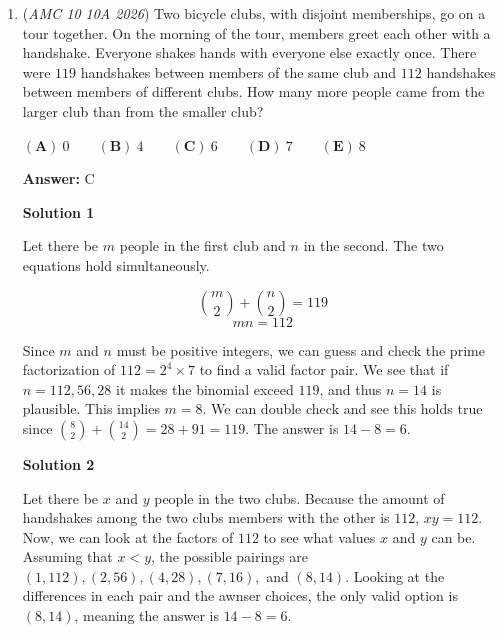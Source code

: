 \begin{enumerate}
 



\textbf{Solution 4 (Cheese)}

There are $2$ possible options for the last sock being chosen, a red sock or a blue sock. This means that the numerator of the solution is divisible by 2. This means that the only possible answer is $\frac{50}{199}.$~Sincostan0~hothost59

 


	\item (\textit{AMC 10 10A 2026}) Two bicycle clubs, with disjoint memberships, go on a tour together. On the morning of
the tour, members greet each other with a handshake. Everyone shakes hands with
everyone else exactly once. There were $119$ handshakes between members of the same
club and $112$ handshakes between members of different clubs. How many more people
came from the larger club than from the smaller club?


 $\mathbf{(A)}~0\qquad\mathbf{(B)}~4\qquad\mathbf{(C)}~6\qquad\mathbf{(D)}~7\qquad\mathbf{(E)}~8$

 \textbf{Answer: }C



\textbf{Solution 1}

Let there be $m$ people in the first club and $n$ in the second. The two equations hold simultaneously.

 
 \[\binom{m}{2} + \binom{n}{2} = 119\]
 \[mn = 112\]

 Since $m$ and $n$ must be positive integers, we can guess and check the prime factorization of $112 = 2^4 \times 7$ to find a valid factor pair. We see that if $n = 112, 56, 28$ it makes the binomial exceed $119$, and thus $n = 14$ is plausible. This implies $m = 8$. We can double check and see this holds true since $\binom{8}{2} + \binom{14}{2} = 28 + 91 = 119$. The answer is $14 - 8 = \boxed{6}$.

 



\textbf{Solution 2}

Let there be $x$ and $y$ people in the two clubs. Because the amount of handshakes among the two clubs members with the other is $112$, $xy = 112$. Now, we can look at the factors of $112$ to see what values $x$ and $y$ can be. Assuming that $x<y$, the possible pairings are $(1,112),(2,56),(4,28),(7,16),$ and $(8,14)$. Looking at the differences in each pair and the awnser choices, the only valid option is $(8,14)$, meaning the answer is $14 -8 = \boxed{6}$.


\end{enumerate}

